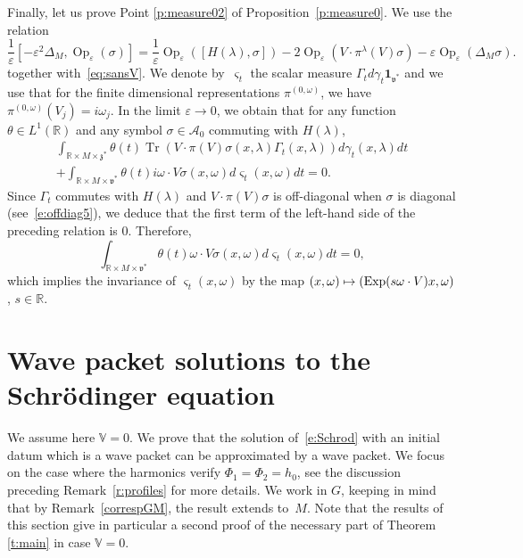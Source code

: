 \documentclass[JEP,XML,SOM,Unicode,published]{cedram}
\let\mathcal\mathscr
\newcommand\mto{\mathchoice{\longmapsto}{\mapsto}{\mapsto}{\mapsto}}
\newcommand{\bun}{\mathbf{1}}
\DeclareMathOperator{\Exp}{Exp}
\DeclareMathOperator{\Op}{Op}
\DeclareMathOperator{\Tr}{Tr}
\theoremstyle{plain}
\theoremstyle{definition}
\let\eps\varepsilon
\def\R{{\mathbb R}}
\def\bbV{{\mathbb V}}
\begin{document}
Finally, let us prove Point \eqref{p:measure02} of Proposition~\ref{p:measure0}. We use the relation
\begin{equation*}
\frac{1}{\eps}[-\eps^2\Delta_M,\Op_\eps(\sigma)]=\frac{1}{\eps}\Op_\eps([H(\lambda),\sigma])-2\Op_\eps(V\cdot \pi^\lambda(V)\sigma)-\eps\Op_\eps(\Delta_M\sigma).
\end{equation*}
together with~\eqref{eq:sansV}. We denote by~$\varsigma_t$ the scalar measure $\Gamma_t d\gamma_t\bun_{\mathfrak v^*}$ and we use that for the finite dimensional representations $\pi^{(0,\omega)}$, we have $\pi^{(0,\omega)}(V_j)=i\omega_j$. In the limit $\eps\to 0$, we obtain that for any function $\theta\in L^1(\R)$ and any symbol $\sigma\in \mathcal A_0$ commuting with $H(\lambda)$,
\begin{multline*}
\int_{\R\times M\times \mathfrak z^*} \theta(t)
\Tr(V\cdot \pi(V) \sigma(x,\lambda)\Gamma_t (x,\lambda)) d\gamma_t (x,\lambda)dt\\[-5pt]
+ \int_{\R\times M\times \mathfrak v^*}\theta(t)i \omega\cdot V\sigma(x,\omega) d\varsigma_t(x,\omega) dt=0.
\end{multline*}
Since $\Gamma_t$ commutes with $H(\lambda)$ and $V\cdot \pi(V)\sigma$ is off-diagonal when $\sigma$ is diagonal (see~\eqref{e:offdiag5}), we deduce that the first term of the left-hand side of the preceding relation is $0$. Therefore,
\[
\int_{\R\times M\times \mathfrak v^*} \theta(t)\omega\cdot V\sigma(x,\omega) d\varsigma_t(x,\omega) dt=0,
\]
which implies the invariance of $\varsigma_t(x,\omega)$ by the map $(x,\omega)\mto (\Exp(s\omega\cdot V) x,\omega)$, $s\in\R$.

\section{Wave packet solutions to the Schrödinger equation} \label{a:wpsolutions}

We assume here $\bbV=0$. We prove that the solution of~\eqref{e:Schrod} with an initial datum which is a wave packet can be approximated by a wave packet. We focus on the case where the harmonics verify $\Phi_1=\Phi_2=h_0$, see the discussion preceding Remark~\ref{r:profiles} for more details. We work in $G$, keeping in mind that by Remark~\ref{correspGM}, the result extends to~$M$. Note that the results of this section give in particular a second proof of the necessary part of Theorem \ref{t:main} in case $\bbV=0$.
\end{document}
